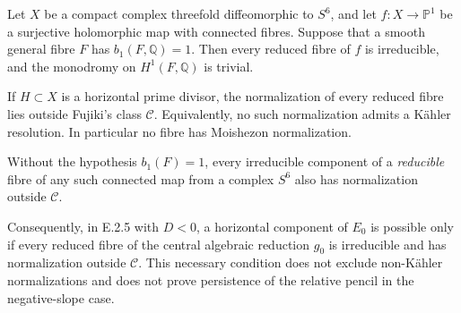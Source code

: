 \begin{proposition}
Let $X$ be a compact complex threefold diffeomorphic to $S^6$, and
let $f:X\to\mathbb P^1$ be a surjective holomorphic map with
connected fibres.  Suppose that a smooth general fibre $F$ has
$b_1(F,\mathbb Q)=1$.  Then every reduced fibre of $f$ is
irreducible, and the monodromy on $H^1(F,\mathbb Q)$ is trivial.

If $H\subset X$ is a horizontal prime divisor, the normalization
of every reduced fibre lies outside Fujiki's class $\mathcal C$.
Equivalently, no such normalization admits a K\"ahler resolution.
In particular no fibre has Moishezon normalization.

Without the hypothesis $b_1(F)=1$, every irreducible component
of a \emph{reducible} fibre of any such connected map from a
complex $S^6$ also has normalization outside $\mathcal C$.

Consequently, in E.2.5 with $D<0$, a horizontal component of
$E_0$ is possible only if every reduced fibre of the central
algebraic reduction $g_0$ is irreducible and has normalization
outside $\mathcal C$.  This necessary condition does not exclude
non-K\"ahler normalizations and does not prove persistence of the
relative pencil in the negative-slope case.
\end{proposition}
